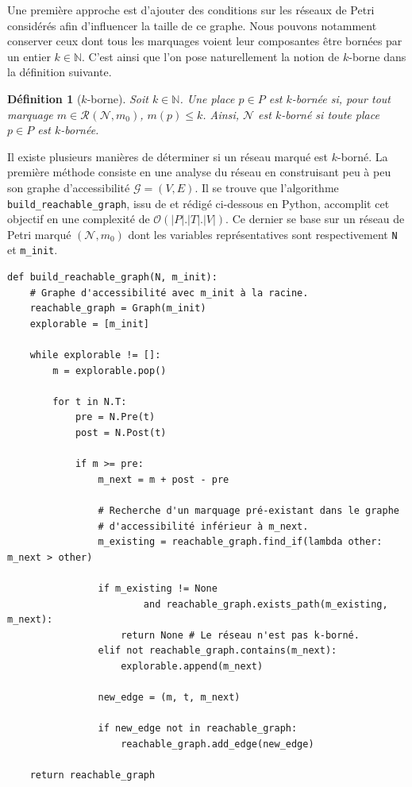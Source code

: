 \documentclass{article}
\newtheorem{definition}{Définition}
\theoremstyle{remark}
\theoremstyle{remark}
\newcommand{\reach}[3][]{\mathcal{R}^{#1}(\mathcal{#2}, #3)}
\begin{document}
Une première approche est d'ajouter des conditions sur les réseaux de Petri considérés afin d'influencer la taille de ce graphe. Nous pouvons notamment conserver ceux dont tous les marquages voient leur composantes être bornées par un entier $k \in \mathbb{N}$. C'est ainsi que l'on pose naturellement la notion de $k$-borne dans la définition suivante.

\begin{definition}[$k$-borne]
    Soit $k \in \mathbb{N}$.
    Une place $p \in P$ est $k$-bornée si, pour tout marquage $m \in \reach{N}{m_0}$, $m(p) \leq k$.
    Ainsi, $\mathcal{N}$ est $k$-borné si toute place $p \in P$ est $k$-bornée.
\end{definition}

Il existe plusieurs manières de déterminer si un réseau marqué est $k$-borné. La première méthode consiste en une analyse du réseau en construisant peu à peu son graphe d'accessibilité $\mathcal{G} = (V, E)$. Il se trouve que l'algorithme \verb|build_reachable_graph|, issu de \cite{delfieu:hal-05069404} et rédigé ci-dessous en Python, accomplit cet objectif en une complexité de $\mathcal{O}(|P|.|T|.|V|)$. Ce dernier se base sur un réseau de Petri marqué $(\mathcal{N}, m_0)$ dont les variables représentatives sont respectivement \verb|N| et \verb|m_init|.

\begin{verbatim}
def build_reachable_graph(N, m_init):
    # Graphe d'accessibilité avec m_init à la racine.
    reachable_graph = Graph(m_init)
    explorable = [m_init]

    while explorable != []:
        m = explorable.pop()

        for t in N.T:
            pre = N.Pre(t)
            post = N.Post(t)
            
            if m >= pre:
                m_next = m + post - pre

                # Recherche d'un marquage pré-existant dans le graphe
                # d'accessibilité inférieur à m_next.
                m_existing = reachable_graph.find_if(lambda other: m_next > other)

                if m_existing != None
                        and reachable_graph.exists_path(m_existing, m_next):
                    return None # Le réseau n'est pas k-borné.
                elif not reachable_graph.contains(m_next):
                    explorable.append(m_next)

                new_edge = (m, t, m_next)

                if new_edge not in reachable_graph:
                    reachable_graph.add_edge(new_edge)

    return reachable_graph
\end{verbatim}
\end{document}
